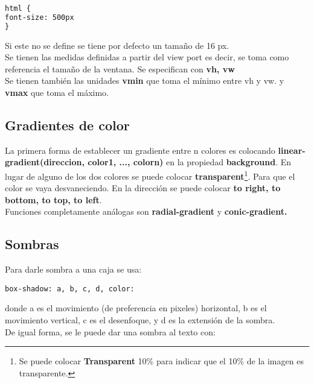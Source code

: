 \documentclass[10pt,oneside]{article}
\begin{document}
\begin{multicols}{2}
\begin{itemize}
        \begin{lstlisting}[language=HTML]
html {
font-size: 500px            
}
        \end{lstlisting}    

         Si este no se define se tiene por defecto un tamaño de 16 px.\\ \newline Se tienen las medidas definidas a partir del view port es decir, se toma como referencia el tamaño de la ventana. Se especifican con \textbf{vh, vw}\\ \newline  Se tienen también las unidades \textbf{vmin} que toma el mínimo entre vh y vw. y  \textbf{vmax} que toma el máximo.
    \end{itemize}

\subsection{Gradientes de color}

    La primera forma de establecer un gradiente entre n colores es colocando \textbf{linear-gradient(direccion, color1, ..., colorn)} en la propiedad \textbf{background}. En lugar de alguno de los dos colores se puede colocar \textbf{transparent}\footnote{Se puede colocar \textbf{Transparent} 10\% para indicar que el 10\% de la imagen es transparente.}. Para que el color se vaya desvaneciendo. En la dirección se puede colocar \textbf{to right, to bottom, to top, to left}. \\ \newline Funciones completamente análogas son \textbf{radial-gradient} y \textbf{conic-gradient.}

\subsection{Sombras}

    Para darle sombra a una caja se usa:

    \begin{lstlisting}
box-shadow: a, b, c, d, color:        
    \end{lstlisting}  

    donde a es el movimiento (de preferencia en pixeles) horizontal, b es el movimiento vertical, c es el desenfoque, y d es la extensión de la sombra.\\\newline De igual forma, se le puede dar una sombra al texto con: 
        

\end{multicols}
\end{document}

